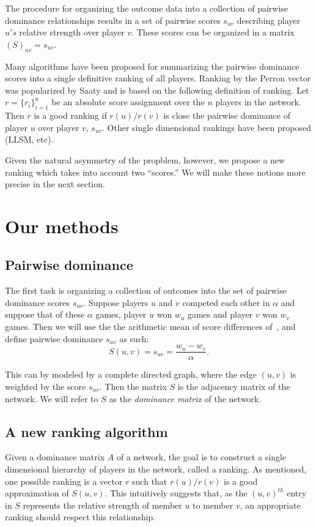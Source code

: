 \documentclass[a4,11pt,twoside,leqno]{report}
\theoremstyle{definition}
\theoremstyle{remark}
\numberwithin{equation}{section}
\begin{document}
The procedure for organizing the outcome data into a collection of pairwise
dominance relationships results in a set of pairwise scores $s_{uv}$ describing
player $u's$ relative strength over player $v$.  These scores can be organized
in a matrix $(S)_{uv} = s_{uv}$.

Many algorithms have been proposed for summarizing the pairwise dominance scores
into a single definitive ranking of all players.  Ranking by the Perron vector
was popularized by Saaty and is based on the following definition of ranking.
Let $r = \{r_i\}_{i=1}^n$ be an absolute score assignment over the $n$ players
in the network.  Then $r$ is a good ranking if $r(u)/r(v)$ is close the pairwise
dominance of player $u$ over player $v$, $s_{uv}$.  Other single dimensional
rankings have been proposed (LLSM, etc).

Given the natural asymmetry of the propblem, however, we propose a new ranking
which takes into account two ``scores.'' We will make these notions more precise
in the next section.

\section{Our methods}\label{sec:methods}

\subsection{Pairwise dominance}
The first task is organizing a collection of outcomes into the set of pairwise
dominance scores $s_{uv}$.  Suppose players $u$ and $v$ competed each other in
$\alpha$ and suppose that of these $\alpha$ games, player $u$ won $w_u$ games
and player $v$ won $w_v$ games.  Then we will use the the arithmetic mean of
score differences of~\cite{jiang:statistical:mp10}, and define pairwise
dominance $s_{uv}$ as such:
\begin{equation}\label{eq:suv}
S(u,v) = s_{uv} = \frac{w_u - w_v}{\alpha}.
\end{equation}

This can by modeled by a complete directed graph, where the edge $(u,v)$ is
weighted by the score $s_{uv}$.  Then the matrix $S$ is the adjacency matrix of
the network.  We will refer to $S$ as the \emph{dominance matrix} of the
network.

\subsection{A new ranking algorithm}
Given a dominance matrix $A$ of a network, the goal is to construct a single
dimensional hierarchy of players in the network, called a ranking.  As
mentioned, one possible ranking is a vector $r$ such that $r(u)/r(v)$ is a good
approximation of $S(u,v)$.  This intuitively suggests that, as the $(u,v)^{th}$
entry in $S$ represents the relative strength of member $u$ to member $v$, an
appropriate ranking should respect this relationship.
\end{document}
